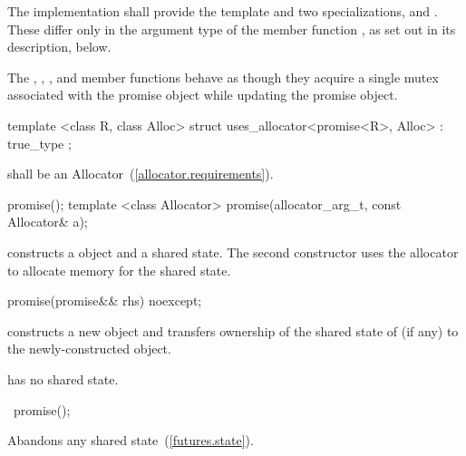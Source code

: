 \pnum
The implementation shall provide the template  and two specializations,
 and . These differ only in the argument type
of the member function , as set out in its description, below.

\pnum
The , , ,
and  member functions behave as though
they acquire a single mutex associated with the promise object while updating the
promise object.

%
\begin{itemdecl}
template <class R, class Alloc>
  struct uses_allocator<promise<R>, Alloc>
    : true_type { };
\end{itemdecl}

\begin{itemdescr}
\pnum
\requires {} shall be an Allocator~(\ref{allocator.requirements}).
\end{itemdescr}


%
\begin{itemdecl}
promise();
template <class Allocator>
  promise(allocator_arg_t, const Allocator& a);
\end{itemdecl}

\begin{itemdescr}
\pnum
\effects constructs a  object and a shared state. The second
constructor uses the allocator  to allocate memory for the shared
state.
\end{itemdescr}

%
\begin{itemdecl}
promise(promise&& rhs) noexcept;
\end{itemdecl}

\begin{itemdescr}
\pnum
\effects constructs a new  object and transfers ownership of the shared state
of  (if any) to the newly-constructed object.

\pnum
\postcondition {} has no shared state.
\end{itemdescr}

%
\begin{itemdecl}
~promise();
\end{itemdecl}

\begin{itemdescr}
\pnum
\effects
Abandons any shared state~(\ref{futures.state}).
\end{itemdescr}

